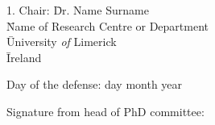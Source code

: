 \documentclass[twoside,12pt]{Latex/Classes/PhDthesisPSnPDF}
\begin{document}
 \begin{tabbing}
1. Chair: \= Dr. Name Surname \\
 \>  \= Name of Research Centre or Department \\
 \>  \= University \emph{of} Limerick \\
 \>  \= Ireland \\
\end{tabbing}


Day of the defense: day month year

\vspace{10mm}
\hspace{60mm}Signature from head of PhD committee:










\frontmatter






\setcounter{secnumdepth}{3} %
\setcounter{tocdepth}{3}    %
\tableofcontents            %



\listoftables  %
\listoffigures	%




% 
%
%
%
\end{document}
